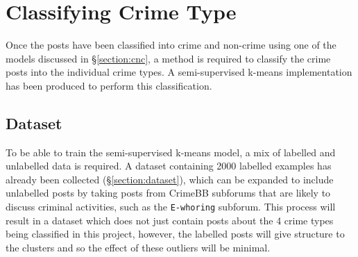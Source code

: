 \documentclass[12pt,a4paper,twoside,openright]{report}
\begin{document}



\section{Classifying Crime Type}
\label{section:kmeansi}
Once the posts have been classified into crime and non-crime using one of the models discussed in \S\ref{section:cnc}, a method is required to classify the crime posts into the individual crime types. A semi-supervised k-means implementation has been produced to perform this classification.  

\subsection{Dataset}
To be able to train the semi-supervised k-means model, a mix of labelled and unlabelled data is required. A dataset containing 2000 labelled examples has already been collected (\S \ref{section:dataset}), which can be expanded to include unlabelled posts by taking posts from CrimeBB subforums that are likely to discuss criminal activities, such as the \texttt{E-whoring} subforum. This process will result in a dataset which does not just contain posts about the 4 crime types being classified in this project, however, the labelled posts will give structure to the clusters and so the effect of these outliers will be minimal. 
\newline
 
\end{document}
